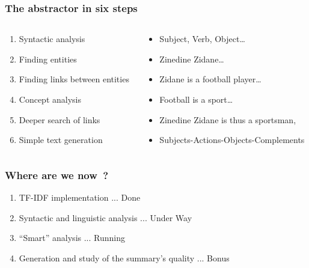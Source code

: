 \documentclass{beamer}
\begin{document}
        \begin{frame}
        \frametitle{The abstractor in six steps}

            \begin{columns}[t]
                \begin{column}{6cm}
                    \begin{enumerate} %
                        \item Syntactic analysis
                        \item Finding entities
                        \item Finding links between entities
                        \item Concept analysis
                        \item Deeper search of links
                        \item Simple text generation
                    \end{enumerate}
                \end{column}

                \begin{column}{7cm}
                    \begin{itemize}
                        \item Subject, Verb, Object\ldots{}
                        \item Zinedine Zidane\ldots{}
                        \item Zidane is a football player\ldots{}
                        \item Football is a sport\ldots{}
                        \item Zinedine Zidane is thus a sportsman,
                        \item Subjects-Actions-Objects-Complements
                    \end{itemize}
                \end{column}
            \end{columns}
        \end{frame}

        \begin{frame}
        \frametitle{Where are we now~?}
            \begin{enumerate}
                \item TF-IDF implementation ... Done
                \item Syntactic and linguistic analysis ... Under Way
                \item ``Smart'' analysis ... Running %
                \item Generation and study of the summary's quality ... Bonus
            \end{enumerate}
        \end{frame}
\end{document}
